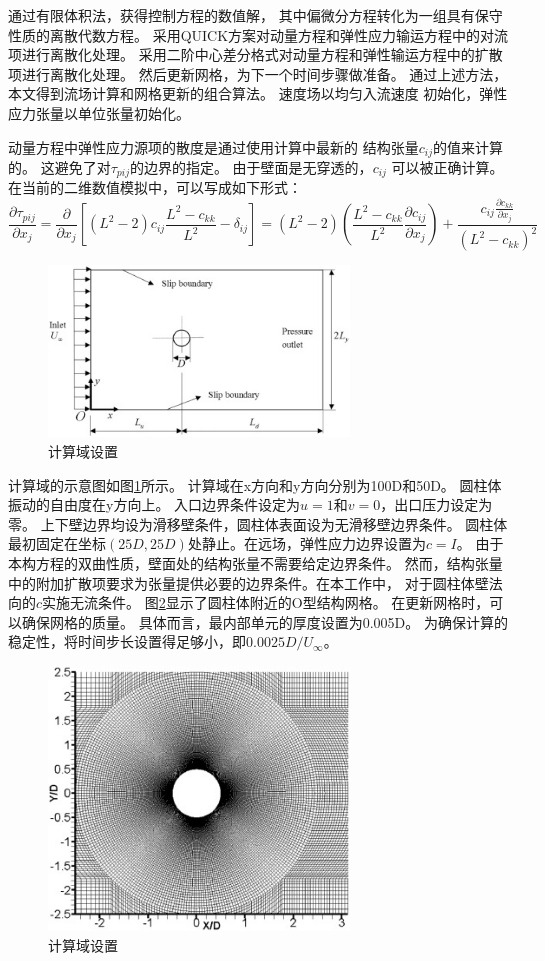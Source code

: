\documentclass[UTF8,zihao=5]{ctexart} %
\begin{document}
通过有限体积法，获得控制方程的数值解，
其中偏微分方程转化为一组具有保守性质的离散代数方程。
采用QUICK方案对动量方程和弹性应力输运方程中的对流项进行离散化处理。
采用二阶中心差分格式对动量方程和弹性输运方程中的扩散项进行离散化处理。
然后更新网格，为下一个时间步骤做准备。
通过上述方法，本文得到流场计算和网格更新的组合算法。
速度场以均匀入流速度
初始化，弹性应力张量以单位张量初始化。

动量方程中弹性应力源项的散度是通过使用计算中最新的
结构张量$c_{ij}$的值来计算的。
这避免了对$\tau_{pij}$的边界的指定。
由于壁面是无穿透的，$c_{ij}$
可以被正确计算。
在当前的二维数值模拟中，可以写成如下形式：
\begin{equation}
    \frac{{\partial \tau_{pij}}}{{\partial x_j}} =
    \frac{{\partial}}{{\partial x_j}} \left[ (L^2-2)c_{ij}\frac{{L^2-c_{kk}}}{L^2}
    - \delta_{ij} \right] = (L^2-2)\left( \frac{{L^2-c_{kk}}}{{L^2}}
    \frac{{\partial c_{ij}}}{{\partial x_j}} \right) + \frac{{c_{ij}
            \frac{{\partial c_{kk}}}{{\partial x_j}}}}{{(L^2-c_{kk})^2}}
\end{equation}
\begin{figure}[H]
    \centering
    \includegraphics[width=8cm]{fig2.jpg}
    \caption{计算域设置}
    \label{fig:2}
\end{figure}
计算域的示意图如图\ref{fig:2}所示。
计算域在x方向和y方向分别为100D和50D。
圆柱体振动的自由度在y方向上。
入口边界条件设定为$u=1$和$v=0$，出口压力设定为零。
上下壁边界均设为滑移壁条件，圆柱体表面设为无滑移壁边界条件。
圆柱体最初固定在坐标$(25D, 25D)$处静止。在远场，弹性应力边界设置为$c=I$。
由于本构方程的双曲性质，壁面处的结构张量不需要给定边界条件。
然而，结构张量中的附加扩散项要求为张量提供必要的边界条件。在本工作中，
对于圆柱体壁法向的$c$实施无流条件。
图\ref{fig:3}显示了圆柱体附近的O型结构网格。
在更新网格时，可以确保网格的质量。
具体而言，最内部单元的厚度设置为0.005D。
为确保计算的稳定性，将时间步长设置得足够小，即$0.0025D/U_\infty$。

\begin{figure}[H]
    \centering
    \includegraphics[width=8cm]{fig3.jpg}
    \caption{计算域设置}
    \label{fig:3}
\end{figure}
\end{document}
